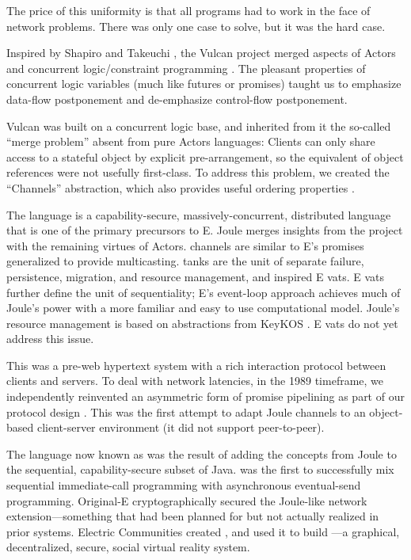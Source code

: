 \documentclass{llncs}
\begin{document}
The price of this uniformity is that all programs had to work
in the face of network problems. There was only one case to solve, but
it was the hard case.

 Inspired by Shapiro and Takeuchi \cite{udi:objects},
the Vulcan project \cite{kahn:vulcan} merged aspects of Actors and
concurrent logic/constraint programming \cite{tr003,Saraswat93}. The
pleasant properties of concurrent logic variables (much like futures
or promises) taught us to emphasize data-flow postponement and
de-emphasize control-flow postponement.

Vulcan was built on a concurrent logic base, and inherited from 
it the so-called ``merge problem'' \cite{Shapiro:merge} absent from
pure Actors languages: Clients can only share access to a stateful
object by explicit pre-arrangement, so the equivalent of object
references were not usefully first-class. To address this problem, we
created the ``Channels'' abstraction, which also provides useful
ordering properties \cite{tribble:channels}.

 The  language \cite{tribble:joule} is a
capability-secure, massively-concurrent, distributed language that is
one of the primary precursors to E. Joule merges insights from the
 project with the remaining virtues of Actors. 
channels are similar to E's promises generalized to provide
multicasting.  tanks are the unit of separate failure,
persistence, migration, and resource management, and inspired E vats.
E vats further define the unit of sequentiality; E's event-loop
approach achieves much of Joule's power with a more familiar and easy
to use computational model. Joule's resource management is based on
abstractions from KeyKOS \cite{hardy:keykos}. E vats do not yet
address this issue.

 This was a pre-web
hypertext system with a rich interaction protocol between clients and
servers. To deal with network latencies, in the 1989 timeframe, we
independently reinvented an asymmetric form of promise pipelining as
part of our protocol design \cite{gold:promises}. This was the first
attempt to adapt Joule channels to an object-based client-server
environment (it did not support peer-to-peer). 

 The language now known as  was
the result of adding the concepts from Joule to the sequential,
capability-secure subset of Java.  was the first to
successfully mix sequential immediate-call programming with
asynchronous eventual-send programming. Original-E cryptographically
secured the Joule-like network extension---something that had been
planned for but not actually realized in prior systems.  Electric
Communities created , and used it to build
---a graphical, decentralized, secure, social virtual
reality system.
\end{document}
